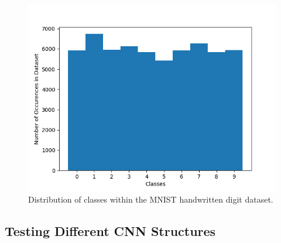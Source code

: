\documentclass[a4paper]{article}
\begin{document}
\begin{figure}[h]
    \centering
    \includegraphics[scale=0.5]{images/mnist-class-dist.png}
    \caption{Distribution of classes within the MNIST handwritten digit dataset.}
    \label{fig:mnist-class-dist}
\end{figure}

\subsection{Testing Different CNN Structures}
\end{document}
